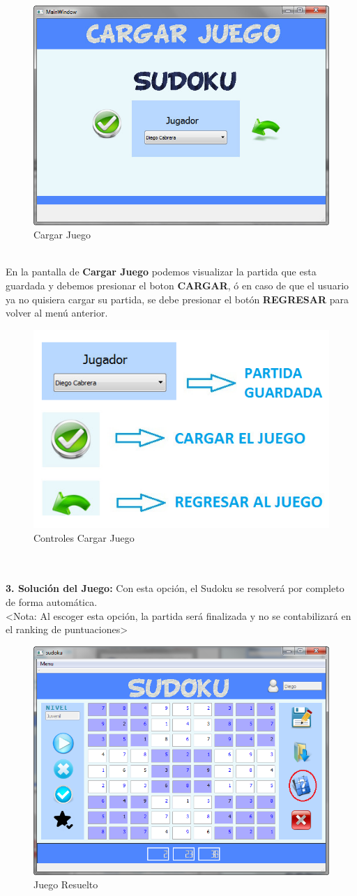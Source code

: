 \begin{figure}[htbp]
\begin{center}
\includegraphics[width=.50\textwidth]{./imagenes/MenuCargar.png}
\caption{Cargar Juego}
\label{Cargar Juego}
\end{center}
\end{figure} 

\ \\ En la pantalla de \textbf{Cargar Juego} podemos visualizar la partida que esta guardada y debemos presionar el boton \textbf{CARGAR}, ó en caso de que el usuario ya no quisiera cargar su partida, se debe presionar el botón \textbf{REGRESAR} para volver al menú anterior.

\begin{figure}[htbp]
\begin{center}
\includegraphics[width=.50\textwidth]{./imagenes/Controles3.png}
\caption{Controles Cargar Juego}
\label{Controles Cargar Juego}
\end{center}
\end{figure} 

\ \\ \ \\ \textbf{3. Solución del Juego:} Con esta opción, el Sudoku se resolverá por completo de forma automática. \\ <Nota: Al escoger esta opción, la partida será finalizada y no se contabilizará en el ranking de puntuaciones>

\begin{figure}[htbp]
\begin{center}
\includegraphics[width=.50\textwidth]{./imagenes/JuegoResuelto.png}
\caption{Juego Resuelto}
\label{Juego Resuelto}
\end{center}
\end{figure} 

